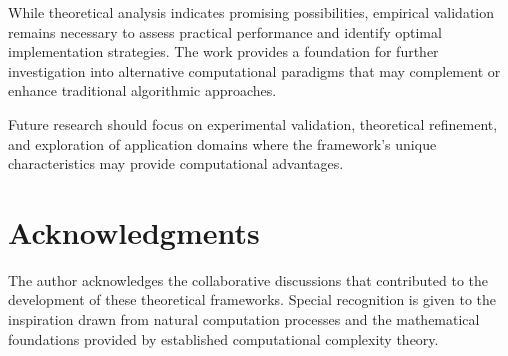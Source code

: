 \documentclass[11pt,a4paper]{article}
\theoremstyle{remark}
\begin{document}
While theoretical analysis indicates promising possibilities, empirical validation remains necessary to assess practical performance and identify optimal implementation strategies. The work provides a foundation for further investigation into alternative computational paradigms that may complement or enhance traditional algorithmic approaches.

Future research should focus on experimental validation, theoretical refinement, and exploration of application domains where the framework's unique characteristics may provide computational advantages.

\section*{Acknowledgments}

The author acknowledges the collaborative discussions that contributed to the development of these theoretical frameworks. Special recognition is given to the inspiration drawn from natural computation processes and the mathematical foundations provided by established computational complexity theory.
\end{document}
